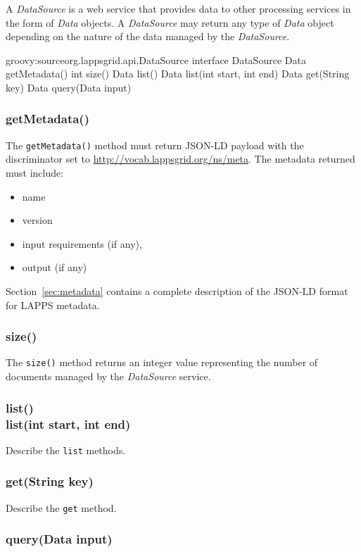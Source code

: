 \documentclass{article}
\newcommand{\lapps}{LAPPS\xspace}
\newcommand{\data}{\emph{Data}\xspace}
\newcommand{\source}{\emph{DataSource}\xspace}
\newcommand{\ns}[1]{\url{http://vocab.lappsgrid.org/ns/#1}}
\renewcommand{\tt}[1]{\texttt{#1}}
\newenvironment{listing}{
\begin{itemize}
  \setlength{\itemsep}{1pt}
  \setlength{\parskip}{0pt}
  \setlength{\parsep}{0pt}
}{\end{itemize}}
\begin{document}
A \source is a web service that provides data to other processing services in the form of \data objects. A \source may return any type of \data object depending on the nature of the data managed by the \source.

\begin{groovy}{groovy:source}{org.lappsgrid.api.DataSource}
	interface DataSource {
		Data getMetadata()
		int size()
		Data list()
		Data list(int start, int end)
		Data get(String key)
		Data query(Data input)
	}
\end{groovy}

\subsubsection{getMetadata()}

The \tt{getMetadata()} method must return JSON-LD payload with the discriminator set to \ns{meta}. The metadata returned must include:
\begin{listing}
	\item name
	\item version
	\item input requirements (if any),
	\item output (if any)
\end{listing}
Section~\ref{sec:metadata} contains a complete description of the JSON-LD format for \lapps metadata.

\subsubsection{size()}
The \tt{size()} method returns an integer value representing the number of documents managed by the \source service.

\subsubsection{list()\\list(int start, int end)}

Describe the \tt{list} methods.

\subsubsection{get(String key)}

Describe the \tt{get} method.

\subsubsection{query(Data input)}
\end{document}
